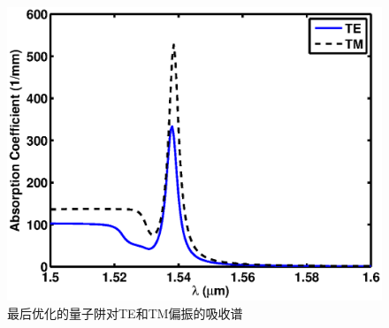 \begin{figure}[htb]
	\centering
	\includegraphics[width=12cm]{./Pictures/fig_ch2_opt_abs_tetm.eps}
	\caption{最后优化的量子阱对TE和TM偏振的吸收谱}
	\label{fig_ch2_opt_abs_tetm}
\end{figure}

